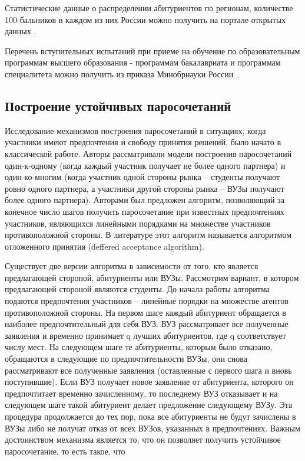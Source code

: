 Статистические данные о распределении абитуриентов по регионам, количестве 100-бальников в каждом из них России можно получить на портале открытых данных \cite{egestat}.

Перечень вступительных испытаний при приеме на обучение по образовательным
программам высшего образования - программам бакалавриата и программам специалитета можно получить из приказа Минобрнауки России \cite{prikaz2}.

\subsection{Построение устойчивых паросочетаний}

Исследование механизмов построения паросочетаний в ситуациях, когда участники имеют предпочтения и свободу принятия решений, было начато в классической работе\cite{gale}. Авторы рассматривали модели построения паросочетаний один-к-одному (когда каждый участник получает не более одного партнера) и один-ко-многим (когда участник одной стороны рынка – студенты получают ровно одного партнера, а
участники другой стороны рынка – ВУЗы получают более одного
партнера). Авторами был предложен алгоритм, позволяющий за конечное число шагов получить паросочетание при известных предпочтениях
участников, являющихся линейными порядками на множестве участников противоположной стороны. В литературе этот алгоритм называется алгоритмом отложенного принятия (deffered acceptance algorithm).

Существует две версии алгоритма в зависимости от того, кто является
предлагающей стороной, абитуриенты или ВУЗы.
Рассмотрим вариант, в котором предлагающей стороной являются студенты. До начала работы алгоритма подаются предпочтения участников – линейные порядки на множестве агентов противоположной стороны.
На первом шаге каждый абитуриент обращается в наиболее предпочтительный для себя ВУЗ. ВУЗ рассматривает все полученные заявления и временно принимает q лучших абитуриентов, где q соответствует числу мест. На следующем шаге те абитуриенты, которым было отказано,
обращаются в следующие по предпочтительности ВУЗы, они снова
рассматривают все полученные заявления (оставленные с первого шага
и вновь поступившие). Если ВУЗ получает новое заявление от абитуриента, которого он предпочтитает временно зачисленному, то последнему
ВУЗ отказывает и на следующем шаге такой абитуриент делает предложение следующему ВУЗу. Эта процедура продолжается до тех пор,
пока все абитуриенты не будут зачислены в ВУЗы либо не получат отказ от всех ВУЗов, указанных в предпочтениях.
Важным достоинством механизма является то, что он позволяет получить устойчивое паросочетание, то есть такое, что

